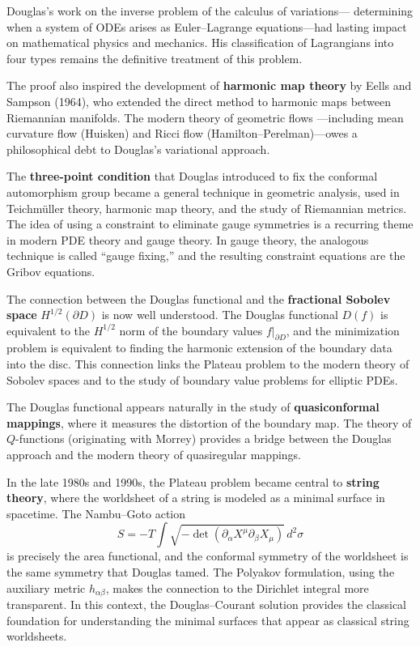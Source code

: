 Douglas's work on the inverse problem of the calculus of variations---
determining when a system of ODEs arises as Euler--Lagrange
equations---had lasting impact on mathematical physics and mechanics.
His classification of Lagrangians into four types remains the definitive
treatment of this problem.

The proof also inspired the development of \textbf{harmonic map theory}
by Eells and Sampson (1964), who extended the direct method to harmonic
maps between Riemannian manifolds. The modern theory of geometric flows
---including mean curvature flow (Huisken) and Ricci flow
(Hamilton--Perelman)---owes a philosophical debt to Douglas's variational
approach.

The \textbf{three-point condition} that Douglas introduced to fix the
conformal automorphism group became a general technique in geometric
analysis, used in Teichm\"{u}ller theory, harmonic map theory, and the
study of Riemannian metrics. The idea of using a constraint to eliminate
gauge symmetries is a recurring theme in modern PDE theory and gauge
theory. In gauge theory, the analogous technique is called ``gauge
fixing,'' and the resulting constraint equations are the Gribov
equations.

The connection between the Douglas functional and the \textbf{fractional
Sobolev space} $H^{1/2}(\partial D)$ is now well understood. The Douglas
functional $D(f)$ is equivalent to the $H^{1/2}$ norm of the boundary
values $f|_{\partial D}$, and the minimization problem is equivalent to
finding the harmonic extension of the boundary data into the disc. This
connection links the Plateau problem to the modern theory of Sobolev
spaces and to the study of boundary value problems for elliptic PDEs.

The Douglas functional appears naturally in the study of
\textbf{quasiconformal mappings}, where it measures the distortion of
the boundary map. The theory of $Q$-functions (originating with Morrey)
provides a bridge between the Douglas approach and the modern theory of
quasiregular mappings.

In the late 1980s and 1990s, the Plateau problem became central to
\textbf{string theory}, where the worldsheet of a string is modeled as a
minimal surface in spacetime. The Nambu--Goto action
\[
S = -T \int \sqrt{-\det(\partial_\alpha X^\mu \partial_\beta X_\mu)} \, d^2\sigma
\]
is precisely the area functional, and the conformal symmetry of the
worldsheet is the same symmetry that Douglas tamed. The Polyakov
formulation, using the auxiliary metric $h_{\alpha\beta}$, makes the
connection to the Dirichlet integral more transparent. In this context,
the Douglas--Courant solution provides the classical foundation for
understanding the minimal surfaces that appear as classical string
worldsheets.

